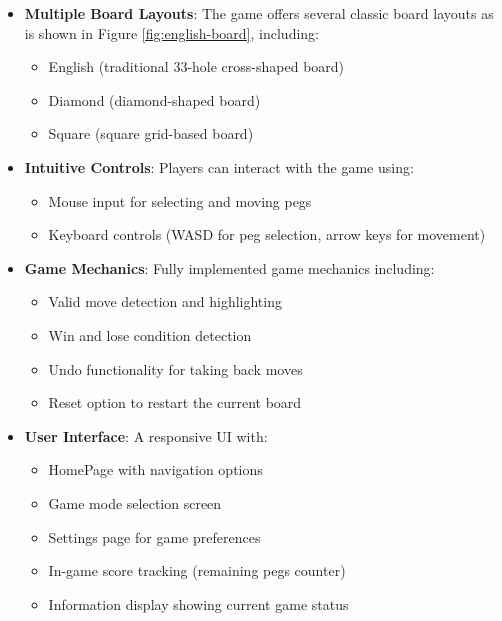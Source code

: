 \begin{itemize}
    \item \textbf{Multiple Board Layouts}:
    The game offers several classic board layouts as is shown in Figure \ref{fig:english-board}, including:
    \begin{itemize}
        \item English (traditional 33-hole cross-shaped board)
        \item Diamond (diamond-shaped board)
        \item Square (square grid-based board)
    \end{itemize}
    
    \item \textbf{Intuitive Controls}: Players can interact with the game using:
    \begin{itemize}
        \item Mouse input for selecting and moving pegs
        \item Keyboard controls (WASD for peg selection, arrow keys for movement)
    \end{itemize}
    
    \item \textbf{Game Mechanics}: Fully implemented game mechanics including:
    \begin{itemize}
        \item Valid move detection and highlighting
        \item Win and lose condition detection
        \item Undo functionality for taking back moves
        \item Reset option to restart the current board
    \end{itemize}
    
    \item \textbf{User Interface}: A responsive UI with:
    \begin{itemize}
        \item HomePage with navigation options
        \item Game mode selection screen
        \item Settings page for game preferences
        \item In-game score tracking (remaining pegs counter)
        \item Information display showing current game status
    \end{itemize}


\end{itemize}
